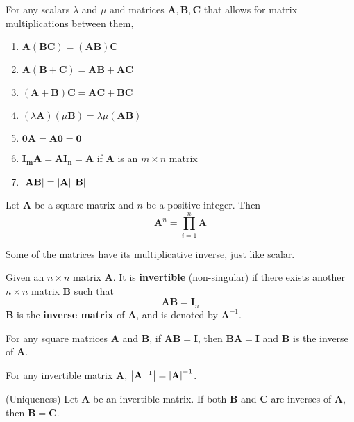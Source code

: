 \documentclass{huhtakm-template-book}
\begin{document}
\begin{lem}
    For any scalars $\lambda$ and $\mu$ and matrices $\mathbf{A},\mathbf{B},\mathbf{C}$ that allows for matrix multiplications between them,
    \begin{enumerate}
        \item $\mathbf{A}(\mathbf{BC})=(\mathbf{AB})\mathbf{C}$
        \item $\mathbf{A}(\mathbf{B}+\mathbf{C})=\mathbf{AB}+\mathbf{AC}$
        \item $(\mathbf{A}+\mathbf{B})\mathbf{C}=\mathbf{AC}+\mathbf{BC}$
        \item $(\lambda\mathbf{A})(\mu\mathbf{B})=\lambda\mu(\mathbf{AB})$
        \item $\mathbf{0A}=\mathbf{A0}=\mathbf{0}$
        \item $\mathbf{I_{m}A}=\mathbf{AI_{n}}=\mathbf{A}$ if $\mathbf{A}$ is an $m\times n$ matrix
        \item $\left|{\mathbf{AB}}\right|=\left|{\mathbf{A}}\right|\left|{\mathbf{B}}\right|$
    \end{enumerate}
\end{lem}
\begin{defn}
    Let $\mathbf{A}$ be a square matrix and $n$ be a positive integer. Then
    \begin{equation*}
        \mathbf{A}^{n}=\prod_{i=1}^{n}\mathbf{A}
    \end{equation*}
\end{defn}
Some of the matrices have its multiplicative inverse, just like scalar.
\begin{defn}
    Given an $n\times n$ matrix $\mathbf{A}$. It is \textbf{invertible} (non-singular) if there exists another $n\times n$ matrix $\mathbf{B}$ such that
    \begin{equation*}
        \mathbf{AB}=\mathbf{I}_{n}
    \end{equation*}
    $\mathbf{B}$ is the \textbf{inverse matrix} of $\mathbf{A}$, and is denoted by $\mathbf{A}^{-1}$.
\end{defn}
\begin{thm}
    For any square matrices $\mathbf{A}$ and $\mathbf{B}$, if $\mathbf{AB}=\mathbf{I}$, then $\mathbf{BA}=\mathbf{I}$ and $\mathbf{B}$ is the inverse of $\mathbf{A}$.
\end{thm}
\begin{lem}
    For any invertible matrix $\mathbf{A}$, $\left|{\mathbf{A}^{-1}}\right|=\left|{\mathbf{A}}\right|^{-1}$.
\end{lem}
\begin{thm}(Uniqueness)
    Let $\mathbf{A}$ be an invertible matrix. If both $\mathbf{B}$ and $\mathbf{C}$ are inverses of $\mathbf{A}$, then $\mathbf{B}=\mathbf{C}$.
\end{thm}
\end{document}
